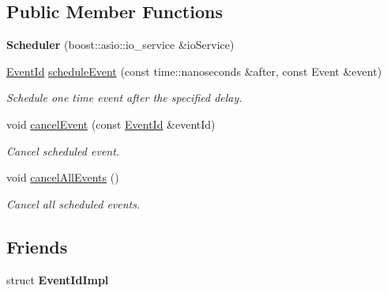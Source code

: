 \subsection*{Public Member Functions}
\begin{DoxyCompactItemize}
\item 
{\bfseries Scheduler} (boost\+::asio\+::io\+\_\+service \&io\+Service)\hypertarget{classndn_1_1util_1_1scheduler_1_1Scheduler_aec11ffae25708d5e9c40bf5eefbf20f9}{}\label{classndn_1_1util_1_1scheduler_1_1Scheduler_aec11ffae25708d5e9c40bf5eefbf20f9}

\item 
\hyperlink{classEventId}{Event\+Id} \hyperlink{classndn_1_1util_1_1scheduler_1_1Scheduler_a83da2ee481b3450d56de699769d31188}{schedule\+Event} (const time\+::nanoseconds \&after, const Event \&event)
\begin{DoxyCompactList}\small\item\em Schedule one time event after the specified delay. \end{DoxyCompactList}\item 
void \hyperlink{classndn_1_1util_1_1scheduler_1_1Scheduler_a1b1562c2d4e7ce1c1087681600f7a999}{cancel\+Event} (const \hyperlink{classEventId}{Event\+Id} \&event\+Id)\hypertarget{classndn_1_1util_1_1scheduler_1_1Scheduler_a1b1562c2d4e7ce1c1087681600f7a999}{}\label{classndn_1_1util_1_1scheduler_1_1Scheduler_a1b1562c2d4e7ce1c1087681600f7a999}

\begin{DoxyCompactList}\small\item\em Cancel scheduled event. \end{DoxyCompactList}\item 
void \hyperlink{classndn_1_1util_1_1scheduler_1_1Scheduler_a58d171ad4904e8d1dfe0d5a02b4376b5}{cancel\+All\+Events} ()\hypertarget{classndn_1_1util_1_1scheduler_1_1Scheduler_a58d171ad4904e8d1dfe0d5a02b4376b5}{}\label{classndn_1_1util_1_1scheduler_1_1Scheduler_a58d171ad4904e8d1dfe0d5a02b4376b5}

\begin{DoxyCompactList}\small\item\em Cancel all scheduled events. \end{DoxyCompactList}\end{DoxyCompactItemize}
\subsection*{Friends}
\begin{DoxyCompactItemize}
\item 
struct {\bfseries Event\+Id\+Impl}\hypertarget{classndn_1_1util_1_1scheduler_1_1Scheduler_ac737f5f1235c74ebf18ef12041d13114}{}\label{classndn_1_1util_1_1scheduler_1_1Scheduler_ac737f5f1235c74ebf18ef12041d13114}

\end{DoxyCompactItemize}


